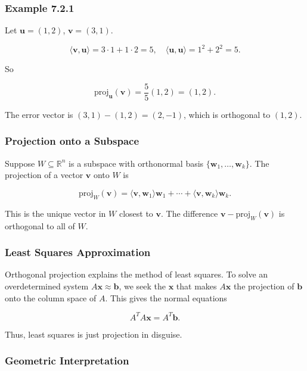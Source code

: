 \documentclass[
  12pt,
  a4paper,
]{article}
\begin{document}
\subsubsection{Example 7.2.1}\label{example-721}

Let \(\mathbf{u} = (1,2)\), \(\mathbf{v} = (3,1)\).

\[\langle \mathbf{v}, \mathbf{u} \rangle = 3\cdot 1 + 1\cdot 2 = 5, \quad 
\langle \mathbf{u}, \mathbf{u} \rangle = 1^2 + 2^2 = 5.\]

So

\[\text{proj}_{\mathbf{u}}(\mathbf{v}) = \frac{5}{5}(1,2) = (1,2).\]

The error vector is \((3,1) - (1,2) = (2,-1)\), which is orthogonal to
\((1,2)\).

\subsubsection{Projection onto a
Subspace}\label{projection-onto-a-subspace}

Suppose \(W \subseteq \mathbb{R}^n\) is a subspace with orthonormal
basis \(\{ \mathbf{w}_1, \dots, \mathbf{w}_k \}\). The projection of a
vector \(\mathbf{v}\) onto \(W\) is

\[\text{proj}_{W}(\mathbf{v}) = \langle \mathbf{v}, \mathbf{w}_1 \rangle \mathbf{w}_1 + \cdots + \langle \mathbf{v}, \mathbf{w}_k \rangle \mathbf{w}_k.\]

This is the unique vector in \(W\) closest to \(\mathbf{v}\). The
difference \(\mathbf{v} - \text{proj}_{W}(\mathbf{v})\) is orthogonal to
all of \(W\).

\subsubsection{Least Squares
Approximation}\label{least-squares-approximation}

Orthogonal projection explains the method of least squares. To solve an
overdetermined system \(A\mathbf{x} \approx \mathbf{b}\), we seek the
\(\mathbf{x}\) that makes \(A\mathbf{x}\) the projection of
\(\mathbf{b}\) onto the column space of \(A\). This gives the normal
equations

\[A^T A \mathbf{x} = A^T \mathbf{b}.\]

Thus, least squares is just projection in disguise.

\subsubsection{Geometric
Interpretation}\label{geometric-interpretation-14}
\end{document}

